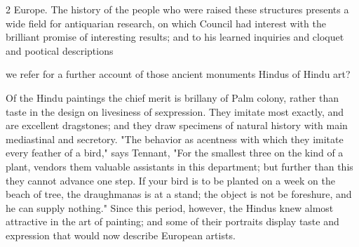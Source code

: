 \documentclass[10pt]{article}
\begin{document}
\begin{multicols}{2}
Europe. The history of the people who were raised these structures presents a wide field for antiquarian research, on which Council had interest with the brilliant promise of interesting results; and to his learned inquiries and cloquet and pootical descriptions

we refer for a further account of those ancient monuments Hindus of Hindu art?

Of the Hindu paintings the chief merit is brillany of Palm colony, rather than taste in the design on livesiness of sexpression. They imitate most exactly, and are excellent dragstones; and they draw specimens of natural history with main mediastinal and secretory. "The behavior as acentness with which they imitate every feather of a bird," says Tennant, "For the smallest three on the kind of a plant, vendors them valuable assistants in this department; but further than this they cannot advance one step. If your bird is to be planted on a week on the beach of tree, the draughmanas is at a stand; the object is not be foreshure, and he can supply nothing." Since this period, however, the Hindus knew almost attractive in the art of painting; and some of their portraits display taste and expression that would now describe European artists.


\end{multicols}
\end{document}
